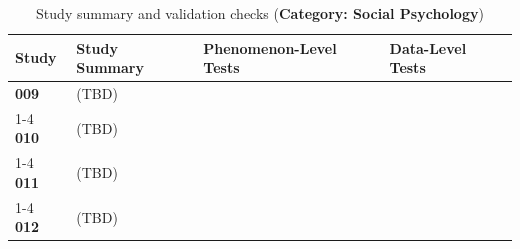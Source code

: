 \begin{table}[htbp]
    \centering
    \caption{Study summary and validation checks (\textbf{Category: Social Psychology})}
    \label{tab:study_summary_social}
    \begin{tabular}{p{1cm}p{5.5cm}p{4cm}p{3.5cm}}
        \toprule
        \textbf{Study} & \textbf{Study Summary} & \textbf{Phenomenon-Level Tests} & \textbf{Data-Level Tests} \\
        \midrule
        
        \textbf{009} & (TBD) & & \\ \cmidrule{1-4}
        \textbf{010} & (TBD) & & \\ \cmidrule{1-4}
        \textbf{011} & (TBD) & & \\ \cmidrule{1-4}
        \textbf{012} & (TBD) & & \\
        
        \bottomrule
    \end{tabular}
    
    \vspace{0.3cm}
    \small
\end{table}
